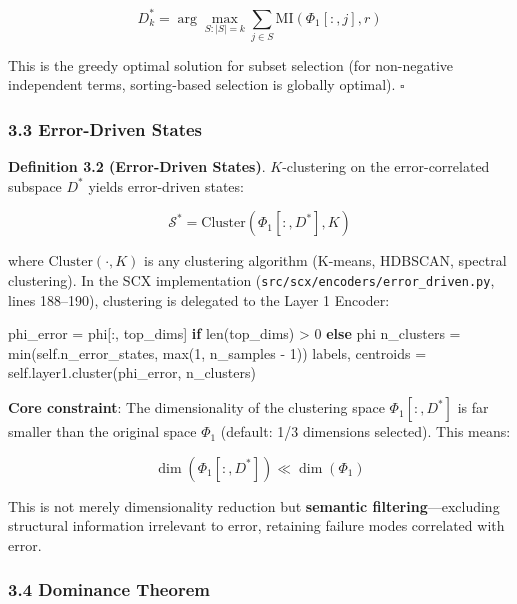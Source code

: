 \documentclass[
  12pt,
]{article}
\newenvironment{Shaded}{}{}
\newcommand{\BuiltInTok}[1]{\textcolor[rgb]{0.00,0.50,0.00}{#1}}
\newcommand{\ControlFlowTok}[1]{\textcolor[rgb]{0.00,0.44,0.13}{\textbf{#1}}}
\newcommand{\DecValTok}[1]{\textcolor[rgb]{0.25,0.63,0.44}{#1}}
\newcommand{\NormalTok}[1]{#1}
\newcommand{\OperatorTok}[1]{\textcolor[rgb]{0.40,0.40,0.40}{#1}}
\newcommand{\VariableTok}[1]{\textcolor[rgb]{0.10,0.09,0.49}{#1}}
\begin{document}
\[D^*_k = \arg\max_{S: |S|=k} \sum_{j \in S} \text{MI}(\Phi_1[:, j], r)\]

This is the greedy optimal solution for subset selection (for non-negative independent terms, sorting-based selection is globally optimal). $\square$

\subsubsection{3.3 Error-Driven States}\label{error-driven-states}

\textbf{Definition 3.2 (Error-Driven States)}. $K$-clustering on the error-correlated subspace $D^*$ yields error-driven states:

\[\mathcal{S}^* = \text{Cluster}(\Phi_1[:, D^*], K)\]

where $\text{Cluster}(\cdot, K)$ is any clustering algorithm (K-means, HDBSCAN, spectral clustering). In the SCX implementation (\texttt{src/scx/encoders/error\_driven.py}, lines 188--190), clustering is delegated to the Layer 1 Encoder:

\begin{Shaded}
\begin{Highlighting}[]
\NormalTok{phi\_error }\OperatorTok{=}\NormalTok{ phi[:, top\_dims] }\ControlFlowTok{if} \BuiltInTok{len}\NormalTok{(top\_dims) }\OperatorTok{\textgreater{}} \DecValTok{0} \ControlFlowTok{else}\NormalTok{ phi}
\NormalTok{n\_clusters }\OperatorTok{=} \BuiltInTok{min}\NormalTok{(}\VariableTok{self}\NormalTok{.n\_error\_states, }\BuiltInTok{max}\NormalTok{(}\DecValTok{1}\NormalTok{, n\_samples }\OperatorTok{{-}} \DecValTok{1}\NormalTok{))}
\NormalTok{labels, centroids }\OperatorTok{=} \VariableTok{self}\NormalTok{.layer1.cluster(phi\_error, n\_clusters)}
\end{Highlighting}
\end{Shaded}

\textbf{Core constraint}: The dimensionality of the clustering space $\Phi_1[:, D^*]$ is far smaller than the original space $\Phi_1$ (default: 1/3 dimensions selected). This means:

\[\dim(\Phi_1[:, D^*]) \ll \dim(\Phi_1)\]

This is not merely dimensionality reduction but \textbf{semantic filtering}---excluding structural information irrelevant to error, retaining failure modes correlated with error.

\subsubsection{3.4 Dominance Theorem}\label{dominance-theorem}
\end{document}
